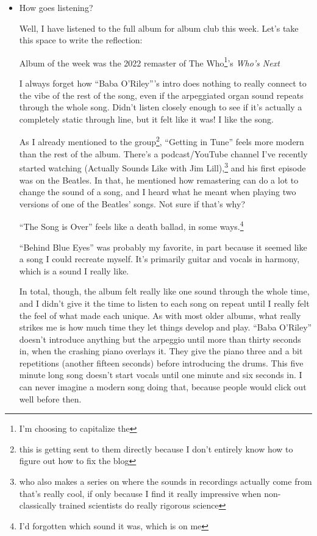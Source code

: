 \documentclass[12pt]{article}
\newcommand{\say}[1]{``#1''}
\renewcommand{\,}{\textsuperscript{,}}
\begin{document}
\begin{itemize}
\begin{itemize}
\begin{itemize}
\item How goes listening?

Well, I have listened to the full album for album club this week. Let's take this space to write the reflection:

Album of the week was the 2022 remaster of The Who\footnote{I'm choosing to capitalize the}'s \textit{Who's Next}

I always forget how \say{Baba O'Riley}'s intro does nothing to really connect to the vibe of the rest of the song, even if the arpeggiated organ sound repeats through the whole song. Didn't listen closely enough to see if it's actually a completely static through line, but it felt like it was! I like the song.

As I already mentioned to the group\footnote{this is getting sent to them directly because I don't entirely know how to figure out how to fix the blog}, \say{Getting in Tune} feels more modern than the rest of the album.  
There's a podcast/YouTube channel I've recently started watching (Actually Sounds Like with Jim Lill),\footnote{who also makes a series on where the sounds in recordings actually come from that's really cool, if only because I find it really impressive when non-classically trained scientists do really rigorous science} and his first episode was on the Beatles.  
In that, he mentioned how remastering can do a lot to change the sound of a song, and I heard what he meant when playing two versions of one of the Beatles' songs.  
Not sure if that's why?

\say{The Song is Over} feels like a death ballad, in some ways.\footnote{I'd forgotten which sound it was, which is on me}

\say{Behind Blue Eyes} was probably my favorite, in part because it seemed like a song I could recreate myself. It's primarily guitar and vocals in harmony, which is a sound I really like.

In total, though, the album felt really like one sound through the whole time, and I didn't give it the time to listen to each song on repeat until I really felt the feel of what made each unique.  
As with most older albums, what really strikes me is how much time they let things develop and play.  
\say{Baba O'Riley} doesn't introduce anything but the arpeggio until more than thirty seconds in, when the crashing piano overlays it.  
They give the piano three and a bit repetitions (another fifteen seconds) before introducing the drums.  
This five minute long song doesn't start vocals until one minute and six seconds in.  
I can never imagine a modern song doing that, because people would click out well before then.


\end{itemize}
\end{itemize}
\end{itemize}
\end{document}
